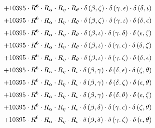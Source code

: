\begin{subequations}
\begin{gather}
 \\[0.2em] \notag 		 + 10395 \cdot R^{6} \cdot R_{\alpha{}} \cdot R_{\eta{}} \cdot R_{\theta{}} \cdot \delta{}\left(\beta{}, \zeta{}\right) \cdot \delta{}\left(\gamma{}, \epsilon{}\right) \cdot \delta{}\left(\delta{}, \iota{}\right) 
 \\[0.2em] \notag 		 + 10395 \cdot R^{6} \cdot R_{\alpha{}} \cdot R_{\eta{}} \cdot R_{\theta{}} \cdot \delta{}\left(\beta{}, \zeta{}\right) \cdot \delta{}\left(\gamma{}, \iota{}\right) \cdot \delta{}\left(\delta{}, \epsilon{}\right) 
 \\[0.2em] \notag 		 + 10395 \cdot R^{6} \cdot R_{\alpha{}} \cdot R_{\eta{}} \cdot R_{\theta{}} \cdot \delta{}\left(\beta{}, \iota{}\right) \cdot \delta{}\left(\gamma{}, \delta{}\right) \cdot \delta{}\left(\epsilon{}, \zeta{}\right) 
 \\[0.2em] \notag 		 + 10395 \cdot R^{6} \cdot R_{\alpha{}} \cdot R_{\eta{}} \cdot R_{\theta{}} \cdot \delta{}\left(\beta{}, \iota{}\right) \cdot \delta{}\left(\gamma{}, \epsilon{}\right) \cdot \delta{}\left(\delta{}, \zeta{}\right) 
 \\[0.2em] \notag 		 + 10395 \cdot R^{6} \cdot R_{\alpha{}} \cdot R_{\eta{}} \cdot R_{\theta{}} \cdot \delta{}\left(\beta{}, \iota{}\right) \cdot \delta{}\left(\gamma{}, \zeta{}\right) \cdot \delta{}\left(\delta{}, \epsilon{}\right) 
 \\[0.2em] \notag 		 + 10395 \cdot R^{6} \cdot R_{\alpha{}} \cdot R_{\eta{}} \cdot R_{\iota{}} \cdot \delta{}\left(\beta{}, \gamma{}\right) \cdot \delta{}\left(\delta{}, \epsilon{}\right) \cdot \delta{}\left(\zeta{}, \theta{}\right) 
 \\[0.2em] \notag 		 + 10395 \cdot R^{6} \cdot R_{\alpha{}} \cdot R_{\eta{}} \cdot R_{\iota{}} \cdot \delta{}\left(\beta{}, \gamma{}\right) \cdot \delta{}\left(\delta{}, \zeta{}\right) \cdot \delta{}\left(\epsilon{}, \theta{}\right) 
 \\[0.2em] \notag 		 + 10395 \cdot R^{6} \cdot R_{\alpha{}} \cdot R_{\eta{}} \cdot R_{\iota{}} \cdot \delta{}\left(\beta{}, \gamma{}\right) \cdot \delta{}\left(\delta{}, \theta{}\right) \cdot \delta{}\left(\epsilon{}, \zeta{}\right) 
 \\[0.2em] \notag 		 + 10395 \cdot R^{6} \cdot R_{\alpha{}} \cdot R_{\eta{}} \cdot R_{\iota{}} \cdot \delta{}\left(\beta{}, \delta{}\right) \cdot \delta{}\left(\gamma{}, \epsilon{}\right) \cdot \delta{}\left(\zeta{}, \theta{}\right) 
 \\[0.2em] \notag 		 + 10395 \cdot R^{6} \cdot R_{\alpha{}} \cdot R_{\eta{}} \cdot R_{\iota{}} \cdot \delta{}\left(\beta{}, \delta{}\right) \cdot \delta{}\left(\gamma{}, \zeta{}\right) \cdot \delta{}\left(\epsilon{}, \theta{}\right) 

\end{gather}
\end{subequations}
